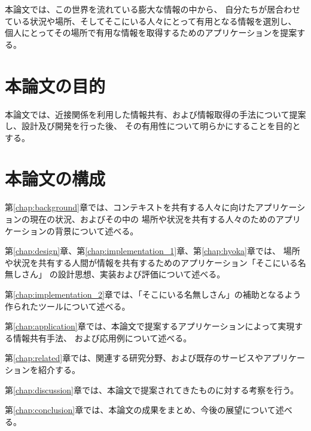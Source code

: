 本論文では、この世界を流れている膨大な情報の中から、
自分たちが居合わせている状況や場所、そしてそこにいる人々にとって有用となる情報を選別し、
個人にとってその場所で有用な情報を取得するためのアプリケーションを提案する。


\newpage


\section{本論文の目的}

本論文では、近接関係を利用した情報共有、および情報取得の手法について提案し、設計及び開発を行った後、
その有用性について明らかにすることを目的とする。


\section{本論文の構成}

第\ref{chap:background}章では、コンテキストを共有する人々に向けたアプリケーションの現在の状況、およびその中の
場所や状況を共有する人々のためのアプリケーションの背景について述べる。

第\ref{chap:design}章、第\ref{chap:implementation_1}章、第\ref{chap:hyoka}章では、
場所や状況を共有する人間が情報を共有するためのアプリケーション「そこにいる名無しさん」
の設計思想、実装および評価について述べる。

第\ref{chap:implementation_2}章では、「そこにいる名無しさん」の補助となるよう作られたツールについて述べる。

第\ref{chap:application}章では、本論文で提案するアプリケーションによって実現する情報共有手法、
および応用例について述べる。

第\ref{chap:related}章では、関連する研究分野、および既存のサービスやアプリケーションを紹介する。

第\ref{chap:discussion}章では、本論文で提案されてきたものに対する考察を行う。

第\ref{chap:conclusion}章では、本論文の成果をまとめ、今後の展望について述べる。
